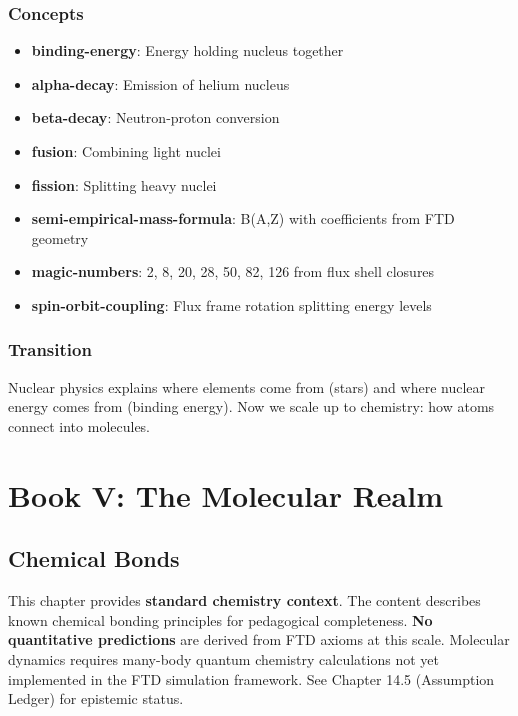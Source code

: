 \documentclass[
  11pt,
  letterpaper,
  twoside,
  openright]{book}
\providecommand{\tightlist}{%
  \setlength{\itemsep}{0pt}\setlength{\parskip}{0pt}}
\begin{document}
\section{Concepts}\label{concepts-3}

\begin{itemize}
\tightlist
\item
  \textbf{binding-energy}: Energy holding nucleus together
\item
  \textbf{alpha-decay}: Emission of helium nucleus
\item
  \textbf{beta-decay}: Neutron-proton conversion
\item
  \textbf{fusion}: Combining light nuclei
\item
  \textbf{fission}: Splitting heavy nuclei
\item
  \textbf{semi-empirical-mass-formula}: B(A,Z) with coefficients from
  FTD geometry
\item
  \textbf{magic-numbers}: 2, 8, 20, 28, 50, 82, 126 from flux shell
  closures
\item
  \textbf{spin-orbit-coupling}: Flux frame rotation splitting energy
  levels
\end{itemize}

\section{Transition}\label{transition-3}

Nuclear physics explains where elements come from (stars) and where
nuclear energy comes from (binding energy). Now we scale up to
chemistry: how atoms connect into molecules.

\part{Book V: The Molecular Realm}

\chapter{Chemical Bonds}\label{sec-chemical-bonds}

\begin{tcolorbox}[enhanced jigsaw, coltitle=black, colbacktitle=quarto-callout-warning-color!10!white, toprule=.15mm, colframe=quarto-callout-warning-color-frame, arc=.35mm, opacityback=0, bottomtitle=1mm, toptitle=1mm, breakable, colback=white, titlerule=0mm, opacitybacktitle=0.6, title=\textcolor{quarto-callout-warning-color}{\faExclamationTriangle}\hspace{0.5em}{Pedagogical Context {[}NOT DERIVED FROM FTD{]}}, rightrule=.15mm, bottomrule=.15mm, leftrule=.75mm, left=2mm]

This chapter provides \textbf{standard chemistry context}. The content
describes known chemical bonding principles for pedagogical
completeness. \textbf{No quantitative predictions} are derived from FTD
axioms at this scale. Molecular dynamics requires many-body quantum
chemistry calculations not yet implemented in the FTD simulation
framework. See Chapter 14.5 (Assumption Ledger) for epistemic status.

\end{tcolorbox}
\end{document}

